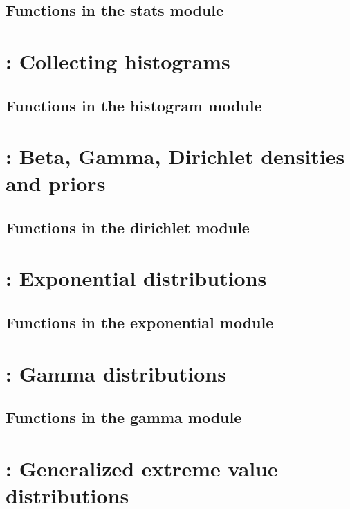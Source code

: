 \documentclass[10pt]{book}
\begin{document}
\subsection{Functions in the stats module}


\newpage
\section{: Collecting histograms}

\subsection{Functions in the histogram module}


\newpage
\section{: Beta, Gamma, Dirichlet densities and priors}

\subsection{Functions in the dirichlet module}


\newpage
\section{: Exponential distributions}

\subsection{Functions in the exponential module}


\newpage
\section{: Gamma distributions}

\subsection{Functions in the gamma module}


\newpage
\section{: Generalized extreme value distributions}

\end{document}

